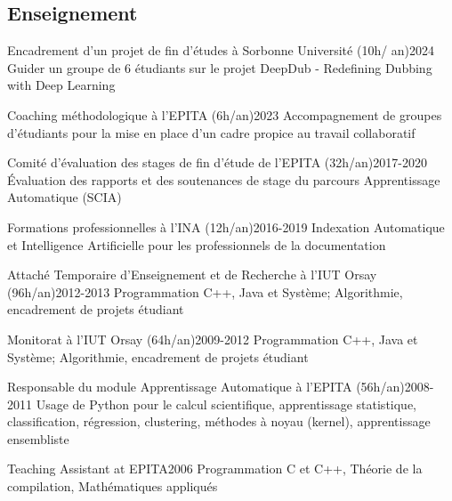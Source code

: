 \begin{fr}
\subsection{Enseignement}

\begin{jobshort}{Encadrement d'un projet de fin d'études à Sorbonne Université (10h/ an)}{2024}
Guider un groupe de 6 étudiants sur le projet DeepDub - Redefining Dubbing with Deep Learning
\end{jobshort}


\begin{jobshort}{Coaching méthodologique à l'EPITA (6h/an)}{2023}
Accompagnement de groupes d'étudiants pour la mise en place d'un cadre propice au travail collaboratif
\end{jobshort}

\begin{jobshort}{Comité d'évaluation des stages de fin d'étude de l'EPITA (32h/an)}{2017-2020}
\'Evaluation des rapports et des soutenances de stage du parcours Apprentissage Automatique (SCIA)
\end{jobshort}

\begin{jobshort}{Formations professionnelles à l'INA (12h/an)}{2016-2019}
Indexation Automatique et Intelligence Artificielle pour les professionnels de la documentation
\end{jobshort}

\begin{jobshort}{Attaché Temporaire d'Enseignement et de Recherche à l'IUT Orsay (96h/an)}{2012-2013}
Programmation C++, Java et Système; Algorithmie, encadrement de projets étudiant
\end{jobshort}

\begin{jobshort}{Monitorat à l'IUT Orsay (64h/an)}{2009-2012}
Programmation C++, Java et Système; Algorithmie, encadrement de projets étudiant
\end{jobshort}

\begin{jobshort}{Responsable du module Apprentissage Automatique à l'EPITA (56h/an)}{2008-2011}
Usage de Python pour le calcul scientifique, apprentissage statistique, classification, régression, clustering, méthodes à noyau (kernel), apprentissage ensembliste
\end{jobshort}

\begin{jobshort}{Teaching Assistant at EPITA}{2006}
Programmation C et C++, Théorie de la compilation,  Mathématiques appliqués
\end{jobshort}

\end{fr}









